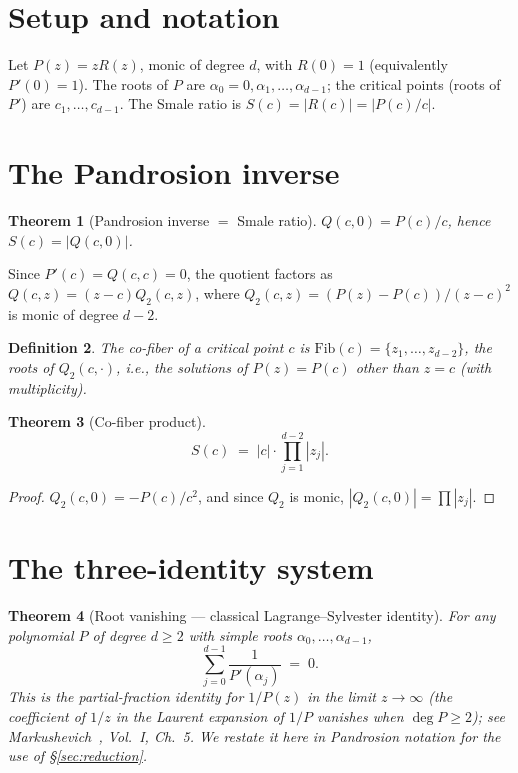 \documentclass[11pt,a4paper]{article}
\newtheorem{theorem}{Theorem}[section]
\newtheorem{definition}[theorem]{Definition}
\begin{document}
\section{Setup and notation}

Let $P(z) = z R(z)$, monic of degree $d$, with $R(0) = 1$ (equivalently $P'(0) = 1$). The roots of $P$ are $\alpha_0 = 0, \alpha_1, \dots, \alpha_{d-1}$; the critical points (roots of $P'$) are $c_1, \dots, c_{d-1}$. The Smale ratio is $S(c) = |R(c)| = |P(c)/c|$.

\section{The Pandrosion inverse}

\begin{theorem}[Pandrosion inverse $=$ Smale ratio]
$Q(c, 0) = P(c)/c$, hence $S(c) = |Q(c, 0)|$.
\end{theorem}

Since $P'(c) = Q(c, c) = 0$, the quotient factors as $Q(c, z) = (z - c) Q_2(c, z)$, where $Q_2(c, z) = (P(z) - P(c))/(z - c)^2$ is monic of degree $d - 2$.

\begin{definition}
The \emph{co-fiber} of a critical point $c$ is $\mathrm{Fib}(c) = \{z_1, \dots, z_{d-2}\}$, the roots of $Q_2(c, \cdot)$, i.e., the solutions of $P(z) = P(c)$ other than $z = c$ (with multiplicity).
\end{definition}

\begin{theorem}[Co-fiber product]
\begin{equation}
S(c) \;=\; |c| \cdot \prod_{j=1}^{d-2} |z_j|.
\end{equation}
\end{theorem}

\begin{proof}
$Q_2(c, 0) = -P(c)/c^2$, and since $Q_2$ is monic, $|Q_2(c, 0)| = \prod |z_j|$. \qedhere
\end{proof}

\section{The three-identity system}

\begin{theorem}[Root vanishing --- classical Lagrange--Sylvester identity]
For any polynomial $P$ of degree $d \ge 2$ with simple roots $\alpha_0, \dots, \alpha_{d-1}$,
\begin{equation}
\sum_{j=0}^{d-1} \frac{1}{P'(\alpha_j)} \;=\; 0.
\end{equation}
This is the partial-fraction identity for $1/P(z)$ in the limit $z \to \infty$ (the coefficient of $1/z$ in the Laurent expansion of $1/P$ vanishes when $\deg P \ge 2$); see Markushevich~\cite{markushevich}, Vol.~I, Ch.~5. We restate it here in Pandrosion notation for the use of \S\ref{sec:reduction}.
\end{theorem}
\end{document}
